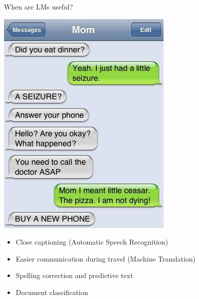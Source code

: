 \documentclass{beamer}
\begin{document}
\begin{frame}{When are LMs useful?}
  \begin{center}
    \includegraphics[height=0.4\textheight]{figures/autocorrect}
  \end{center}
  \begin{itemize}
  \item Close captioning (Automatic Speech Recognition)
  \item Easier communication during travel (Machine Translation)
  \item Spelling correction and predictive text
  \item Document classification 
  \end{itemize}
\end{frame}
\end{document}
